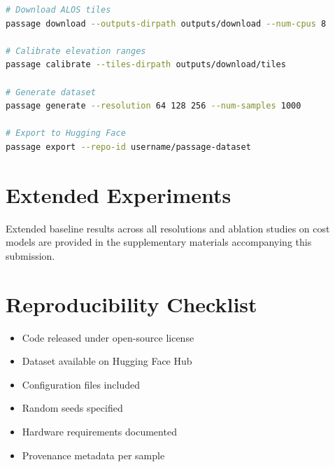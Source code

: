 \documentclass{article}
\begin{document}
\begin{lstlisting}[language=bash,caption={CLI commands}]
# Download ALOS tiles
passage download --outputs-dirpath outputs/download --num-cpus 8

# Calibrate elevation ranges
passage calibrate --tiles-dirpath outputs/download/tiles

# Generate dataset
passage generate --resolution 64 128 256 --num-samples 1000

# Export to Hugging Face
passage export --repo-id username/passage-dataset
\end{lstlisting}

\section{Extended Experiments}
\label{app:experiments}

Extended baseline results across all resolutions and ablation studies on cost models are provided in the supplementary materials accompanying this submission.

\section{Reproducibility Checklist}
\label{app:reproducibility}

\begin{itemize}[noitemsep]
    \item[$\checkmark$] Code released under open-source license
    \item[$\checkmark$] Dataset available on Hugging Face Hub
    \item[$\checkmark$] Configuration files included
    \item[$\checkmark$] Random seeds specified
    \item[$\checkmark$] Hardware requirements documented
    \item[$\checkmark$] Provenance metadata per sample
\end{itemize}
\end{document}
